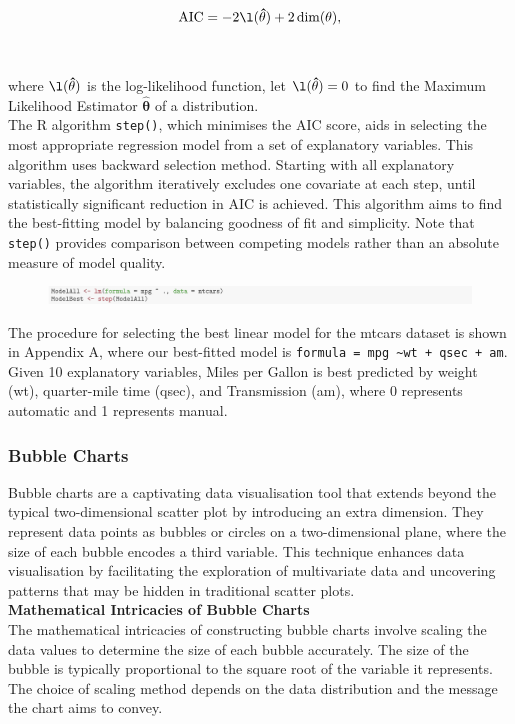 \documentclass{article}\usepackage[]{graphicx}\usepackage[]{xcolor}
\begin{document}
$$\mathrm{AIC} = -2 \l(\mathbf{\hat{\theta}})+2 \dim (\mathbf{\theta}),$$
\\  
\\where $\l(\mathbf{\hat{\theta}})$ is the log-likelihood function, let $\l(\mathbf{\hat{\theta}}) = 0$ to find the Maximum Likelihood Estimator $\mathbf{\hat{\theta}}$ of a distribution.\\

\noindent 
The R algorithm \texttt{step()}, which minimises the AIC score, aids in selecting the most appropriate regression model from a set of explanatory variables. This algorithm uses backward selection method. Starting with all explanatory variables, the algorithm iteratively excludes one covariate at each step, until statistically significant reduction in AIC is achieved. This algorithm aims to find the best-fitting model by balancing goodness of fit and simplicity. Note that \texttt{step()} provides comparison between competing models rather than an absolute measure of model quality.

\begin{figure}[H]
    \centering
    \includegraphics[width=1\textwidth]{image_reference/codeshoot.png}
    \label{fig:codeshoot}
\end{figure}
\noindent
The procedure for selecting the best linear model for the mtcars dataset is shown in Appendix A, where our best-fitted model is \texttt{formula = mpg \textasciitilde wt + qsec + am}. Given 10 explanatory variables, Miles per Gallon is best predicted by weight (wt), quarter-mile time (qsec), and Transmission (am), where 0 represents automatic and 1 represents manual.

\subsubsection{Bubble Charts}
Bubble charts are a captivating data visualisation tool that extends beyond the typical two-dimensional scatter plot by introducing an extra dimension. They represent data points as bubbles or circles on a two-dimensional plane, where the size of each bubble encodes a third variable. This technique enhances data visualisation by facilitating the exploration of multivariate data and uncovering patterns that may be hidden in traditional scatter plots.\\

\noindent
\textbf{Mathematical Intricacies of Bubble Charts}\\
The mathematical intricacies of constructing bubble charts involve scaling the data values to determine the size of each bubble accurately. The size of the bubble is typically proportional to the square root of the variable it represents. The choice of scaling method depends on the data distribution and the message the chart aims to convey.\\
\end{document}

